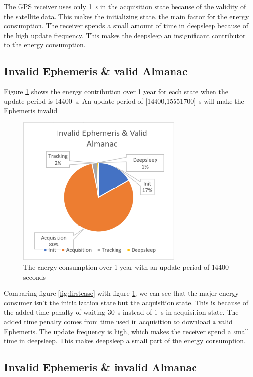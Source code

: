 The GPS receiver uses only 1 \,s in the acquisition state because of the validity of the satellite data. This makes the initializing state, the main factor for the energy consumption. The receiver spends a small amount of time in deepsleep because of the high update frequency. This makes the deepsleep an insignificant contributor to the energy consumption. 

\subsection{Invalid Ephemeris \& valid Almanac}
Figure \ref{fig:secondcase} shows the energy contribution over 1 year for each state when the update period is 14400 \,s. An update period of [14400,15551700] \,s will make the Ephemeris invalid.

\begin{figure}[H]
\centering
\includegraphics[height=7.5cm]{Project_Report/Images/invalidvalid.PNG}
\caption{The energy consumption over 1 year with an update period of 14400 seconds}
\label{fig:secondcase}
\end{figure}

Comparing figure \ref{fig:firstcase} with figure \ref{fig:secondcase}, we can see that the major energy consumer isn't the initialization state but the acquisition state. This is because of the added time penalty of waiting 30 \,s instead of 1 \,s in acquisition state. The added time penalty comes from time used in acquisition to download a valid Ephemeris. The update frequency is high, which makes the receiver spend a small time in deepsleep. This makes deepsleep a small part of the energy consumption.  

\subsection{Invalid Ephemeris \& invalid Almanac}

